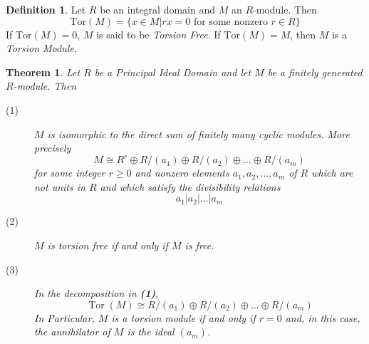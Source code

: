 \documentclass[12pt,leqno]{article}
\numberwithin{equation}{section}
\newtheorem{thm}{Theorem}[section]
\theoremstyle{definition}
\newtheorem*{Def}{Definition}
\newcommand{\Tor}{\operatorname{Tor}}
\begin{document}
\begin{Def}
 Let $R$ be an integral domain and $M$ an $R$-module. Then \[\text{Tor}(M)=\{x\in M|rx=0\text{ for some nonzero }r\in R\}\] If $\text{Tor}(M)=0$, $M$ is said to be \textit{Torsion Free}. If $\text{Tor}(M)=M$, then $M$ is a \textit{Torsion Module}.
\end{Def}

\begin{thm}
 Let $R$ be a Principal Ideal Domain and let $M$ be a finitely generated $R$-module. Then
\begin{description}
 \item [(1)] $M$ is isomorphic to the direct sum of finitely many cyclic modules. More precisely \[M\cong R^r\oplus R/(a_1)\oplus R/(a_2)\oplus\hdots\oplus R/(a_m)\] for some integer $r\geq0$ and nonzero elements $a_1,a_2,\hdots,a_m$ of $R$ which are not units in $R$ and which satisfy the divisibility relations \[a_1|a_2|\hdots|a_m\]
 \item [(2)] $M$ is torsion free if and only if $M$ is free.
 \item [(3)] In the decomposition in \textbf{(1)}, \[\Tor(M)\cong R/(a_1)\oplus R/(a_2)\oplus\hdots\oplus R/(a_m)\] In Particular, $M$ is a torsion module if and only if $r=0$ and, in this case, the annihilator of $M$ is the ideal $(a_m)$.
\end{description}
\end{thm}
\end{document}
